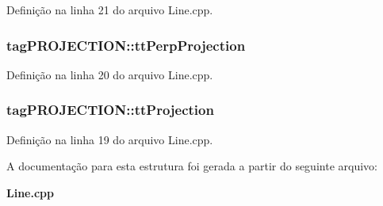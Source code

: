 Definição na linha 21 do arquivo Line.\+cpp.

\subsubsection[{tt\+Perp\+Projection}]{ tag\+P\+R\+O\+J\+E\+C\+T\+I\+O\+N\+::tt\+Perp\+Projection}\label{structtag_p_r_o_j_e_c_t_i_o_n_a53973d1bb132caaa745e01d1c905417b}


Definição na linha 20 do arquivo Line.\+cpp.

\subsubsection[{tt\+Projection}]{ tag\+P\+R\+O\+J\+E\+C\+T\+I\+O\+N\+::tt\+Projection}\label{structtag_p_r_o_j_e_c_t_i_o_n_a7f9f59a3202df132ca64f733117eda8c}


Definição na linha 19 do arquivo Line.\+cpp.



A documentação para esta estrutura foi gerada a partir do seguinte arquivo\+:\begin{DoxyCompactItemize}
\item 
{\bf Line.\+cpp}\end{DoxyCompactItemize}
